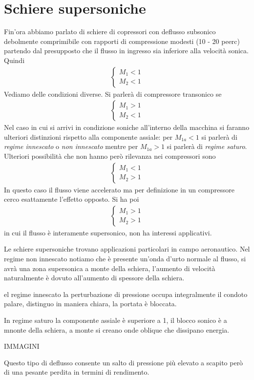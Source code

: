 \section{Schiere supersoniche}
Fin'ora abbiamo parlato di schiere di copressori con deflusso subsonico debolmente comprimibile con rapporti di compressione modesti (10 - 20 peerc) partendo dal presupposto che il flusso in ingresso sia inferiore alla velocità sonica. Quindi 
\begin{align*}
\begin{cases}
M_1 <1\\
M_2 <1
\end{cases}
\end{align*} 
Vediamo delle condizioni diverse. Si parlerà di compressore transonico se 
\begin{align*}
\begin{cases}
M_1 >1\\
M_2 <1
\end{cases}
\end{align*} 
Nel caso in cui si arrivi in condizione soniche all'interno della macchina si faranno ulteriori distinzioni rispetto alla componente assiale: per $M_{1a} < 1 $ si parlerà di \textit{regime innescato} o \textit{non innescato} mentre per $ M_{1a} > 1 $ si parlerà di \textit{regime saturo}.
Ulteriori possibilità che non hanno però rilevanza nei compressori sono 
\begin{align*}
\begin{cases}
M_1 <1\\
M_2 >1
\end{cases}
\end{align*} 
In questo caso il flusso viene accelerato ma per definizione in un compressore cerco esattamente l'effetto opposto. Si ha poi
\begin{align*}
\begin{cases}
M_1 >1\\
M_2 >1
\end{cases}
\end{align*} 
in cui il flusso è interamente supersonico, non ha interessi applicativi.

Le schiere supersoniche trovano applicazioni particolari in campo aeronautico. Nel regime non innescato notiamo che è presente un'onda d'urto normale al flusso, si avrà una zona supersonica a monte della schiera, l'aumento di velocità naturalmente è dovuto all'aumento di spessore della schiera.

el regime innescato la perturbazione di pressione occupa integralmente il condoto palare, distinguo in maniera chiara, la portata è bloccata. 

In regime saturo la componente assiale è superiore a 1, il blocco sonico è a mnonte della schiera, a monte si creano onde oblique che dissipano energia.

IMMAGINI

Questo tipo di deflusso consente un salto di pressione più elevato a scapito però di una pesante perdita in termini di rendimento. 
